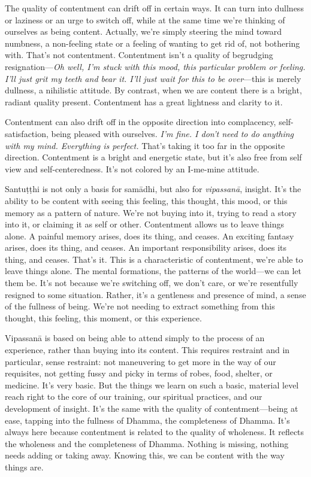 The quality of contentment can drift off in certain ways. It can turn 
into dullness or laziness or an urge to switch off, while at the same 
time we're thinking of ourselves as being content. Actually, we're 
simply steering the mind toward numbness, a non-feeling state or a 
feeling of wanting to get rid of, not bothering with. That's not 
contentment. Contentment isn't a quality of begrudging 
resignation---\emph{Oh well, I'm stuck with this mood, this particular 
problem or feeling. I'll just grit my teeth and bear it. I'll just wait 
for this to be over}---this is merely dullness, a nihilistic attitude. 
By contrast, when we are content there is a bright, radiant quality 
present. Contentment has a great lightness and clarity to it.

Contentment can also drift off in the opposite direction into 
complacency, self-satisfaction, being pleased with ourselves. \emph{I'm 
fine. I don't need to do anything with my mind. Everything is perfect.} 
That's taking it too far in the opposite direction. Contentment is a 
bright and energetic state, but it's also free from self view and 
self-centeredness. It's not colored by an I-me-mine attitude.

Santuṭṭhi is not only a basis for samādhi, but also for 
\emph{vipassanā}, insight. It's the ability to be content with seeing 
this feeling, this thought, this mood, or this memory as a pattern of 
nature. We're not buying into it, trying to read a story into it, or 
claiming it as self or other. Contentment allows us to leave things 
alone. A painful memory arises, does its thing, and ceases. An exciting 
fantasy arises, does its thing, and ceases. An important responsibility 
arises, does its thing, and ceases. That's it. This is a characteristic 
of contentment, we're able to leave things alone. The mental 
formations, the patterns of the world---we can let them be. It's not 
because we're switching off, we don't care, or we're resentfully 
resigned to some situation. Rather, it's a gentleness and presence of 
mind, a sense of the fullness of being. We're not needing to extract 
something from this thought, this feeling, this moment, or this 
experience.

Vipassanā is based on being able to attend simply to the process of an 
experience, rather than buying into its content. This requires 
restraint and in particular, sense restraint: not maneuvering to get 
more in the way of our requisites, not getting fussy and picky in terms 
of robes, food, shelter, or medicine. It's very basic. But the things 
we learn on such a basic, material level reach right to the core of our 
training, our spiritual practices, and our development of insight. It's 
the same with the quality of contentment---being at ease, tapping into 
the fullness of Dhamma, the completeness of Dhamma. It's always here 
because contentment is related to the quality of wholeness. It reflects 
the wholeness and the completeness of Dhamma. Nothing is missing, 
nothing needs adding or taking away. Knowing this, we can be content 
with the way things are.

